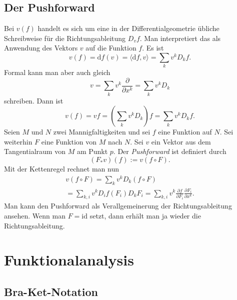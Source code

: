 \documentclass[a4paper,11pt,fleqn,twocolumn,twoside]{scrartcl}
\numberwithin{equation}{section}
\begin{document}
\subsection{Der Pushforward}

Bei $v(f)$ handelt es sich um eine in der Differentialgeometrie
übliche Schreibweise für die Richtungsableitung $D_v f$. Man
interpretiert das als Anwendung des Vektors $v$ auf die Funktion
$f$. Es ist
\begin{equation}
v(f) = \mathrm df(v) = \langle\mathrm df,v\rangle
= \sum_k v^k D_k f.
\end{equation}
Formal kann man aber auch gleich
\begin{equation}
v=\sum_k v^k\frac{\partial}{\partial x^k} = \sum_k v^k D_k
\end{equation}
schreiben. Dann ist
\begin{equation}
v(f) = vf = (\sum_k v^k D_k)f = \sum_k v^k D_k f.
\end{equation}
%
Seien $M$ und $N$ zwei Mannigfaltigkeiten und sei $f$ eine
Funktion auf $N$. Sei weiterhin $F$ eine Funktion von $M$ nach
$N$. Sei $v$ ein Vektor aus dem Tangentialraum von $M$ am Punkt
$p$. Der \textit{Pushforward} ist definiert durch
\begin{equation}
(F_\ast v)(f) := v(f\circ F).
\end{equation}
Mit der Kettenregel rechnet man nun
\begin{gather*}
v(f\circ F) = \sum_k v^k D_k(f\circ F)\\
= \sum_{k,i} v^k D_i f(F_i)D_k F_i
= \sum_{k,i} v^k \frac{\partial f}{\partial F_i}
\frac{\partial F_i}{\partial x^k}.
\end{gather*}
Man kann den Pushforward als Verallgemeinerung der Richtungsableitung
ansehen. Wenn man $F=\mathrm{id}$ setzt, dann erhält man ja wieder
die Richtungsableitung.



\section{Funktionalanalysis}

\subsection{Bra-Ket-Notation}
\end{document}

